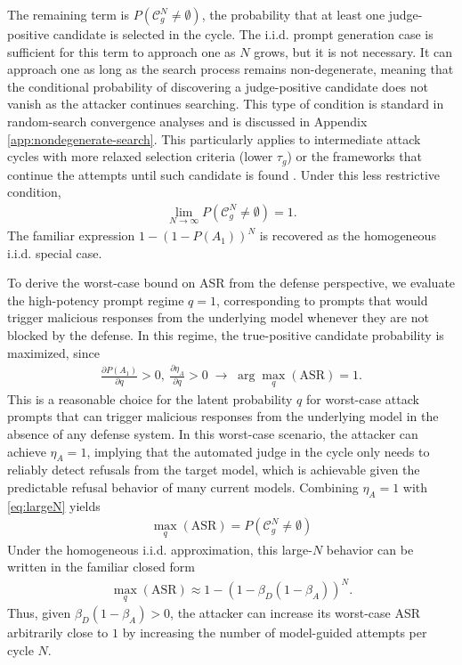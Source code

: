 \documentclass[conference,compsoc]{IEEEtran}
\begin{document}
The remaining term is $P(\mathcal{C}^N_g \ne \emptyset)$, the probability that at least one judge-positive candidate is selected in the cycle.
The i.i.d. prompt generation case is sufficient for this term to approach one as $N$ grows, but it is not necessary.
It can approach one as long as the search process remains non-degenerate, meaning that the conditional probability of discovering a judge-positive candidate does not vanish as the attacker continues searching.
This type of condition is standard in random-search convergence analyses \cite{solis1981minimization} and is discussed in Appendix \ref{app:nondegenerate-search}.
This particularly applies to intermediate attack cycles with more relaxed selection criteria (lower $\tau_g$) or the frameworks that continue the attempts until such candidate is found \cite{gcg2023,autodan2023}.
Under this less restrictive condition,
\begin{align}\label{eq:largeN}
    \lim_{N\to\infty}P(\mathcal{C}^N_g \ne \emptyset)=1.
\end{align}
The familiar expression $1-(1-P(A_1))^N$ is recovered as the homogeneous i.i.d. special case.

To derive the worst-case bound on ASR from the defense perspective, we evaluate the high-potency prompt regime $q=1$, corresponding to prompts that would trigger malicious responses from the underlying model whenever they are not blocked by the defense.
In this regime, the true-positive candidate probability is maximized, since
\begin{align}\label{eq:partial}
    \frac{\partial P(A_1)}{\partial q} > 0 , ~\frac{\partial \eta_A}{\partial q} > 0 \;\rightarrow\; \arg\max_q(\mathrm{ASR}) = 1.
\end{align}
This is a reasonable choice for the latent probability $q$ for worst-case attack prompts that can trigger malicious responses from the underlying model in the absence of any defense system.
In this worst-case scenario, the attacker can achieve $\eta_A=1$, implying that the automated judge in the cycle only needs to reliably detect refusals from the target model, which is achievable given the predictable refusal behavior of many current models.
Combining $\eta_A=1$ with \eqref{eq:largeN} yields
\begin{align}\label{eq:baseasr}
    \max_q(\mathrm{ASR}) = P(\mathcal{C}^N_g \ne \emptyset)
\end{align}
Under the homogeneous i.i.d. approximation, this large-$N$ behavior can be written in the familiar closed form
\begin{align}\label{eq:baseasr_iid}
    \max_q(\mathrm{ASR}) \approx 1 - (1-\beta_D(1-\beta_A))^N.
\end{align}
Thus, given $\beta_D(1-\beta_A)>0$, the attacker can increase its worst-case ASR arbitrarily close to $1$ by increasing the number of model-guided attempts per cycle $N$.
\end{document}

